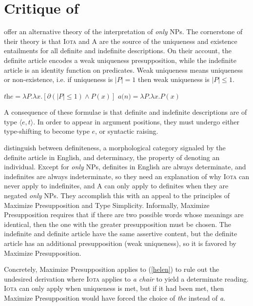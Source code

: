 \section{Critique of \citet{cb2015}\label{sec:coppock-beaver}}
\citet{cb2015} offer an alternative theory of the interpretation of \textit{only} NPs. The cornerstone of their theory is that \textsc{Iota} and \textsc{A} are the source of the uniqueness and existence entailments for all definite and indefinite descriptions. On their account, the definite article encodes a weak uniqueness presupposition, while the indefinite article is an identity function on predicates. Weak uniqueness means uniqueness or non-existence, i.e. if uniqueness is $|P| = 1$ then weak uniqueness is $|P| \le 1$.

\begin{exe}
	\ex $\textit{the} = \lambda P . \lambda x . [\partial(|P| \le 1) \land P(x)]$
	\ex $\textit{a(n)} = \lambda P . \lambda x . P(x)$
\end{exe}

A consequence of these formulae is that definite and indefinite descriptions are of type $\langle e, t \rangle$. In order to appear in argument positions, they must undergo either type-shifting to become type $e$, or syntactic raising.

\citeauthor{cb2015} distinguish between definiteness, a morphological category signaled by the definite article in English, and determinacy, the property of denoting an individual. Except for \textit{only} NPs, definites in English are always determinate, and indefinites are always indeterminate, so they need an explanation of why \textsc{Iota} can never apply to indefinites, and \textsc{A} can only apply to definites when they are negated \textit{only} NPs. They accomplish this with an appeal to the principles of Maximize Presupposition and Type Simplicity. Informally, Maximize Presupposition requires that if there are two possible words whose meanings are identical, then the one with the greater presupposition must be chosen. The indefinite and definite article have the same assertive content, but the definite article has an additional presupposition (weak uniqueness), so it is favored by Maximize Presupposition.

Concretely, Maximize Presupposition applies to (\ref{helen}) to rule out the undesired derivation where \textsc{Iota} applies to \textit{a chair} to yield a determinate reading. \textsc{Iota} can only apply when uniqueness is met, but if it had been met, then Maximize Presupposition would have forced the choice of \textit{the} instead of \textit{a}.

